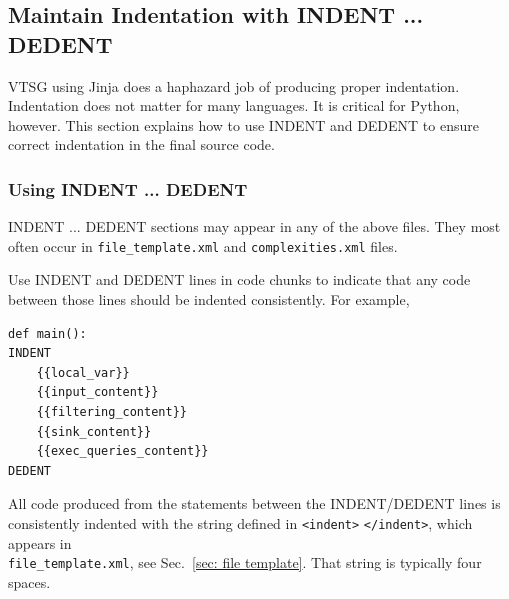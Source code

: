 \documentclass[12pt]{article}
\begin{document}
\subsection{Maintain Indentation with INDENT ... DEDENT}
\label{sec:indent}

VTSG using Jinja does a haphazard job of producing proper indentation.  Indentation
does not matter for many languages.  It is critical for Python, however.  This
section explains how to use INDENT and DEDENT to ensure correct indentation in the
final source code.

\subsubsection{Using INDENT ... DEDENT}
INDENT ... DEDENT sections may appear in any of the above files.  They
most often occur in \verb|file_template.xml| and \verb|complexities.xml| files.

Use INDENT and DEDENT lines in code chunks to indicate that
any code between those lines should be indented consistently.  For example,
\begin{verbatim}
def main():
INDENT
    {{local_var}}
    {{input_content}}
    {{filtering_content}}
    {{sink_content}}
    {{exec_queries_content}}
DEDENT
\end{verbatim}
All code produced from the statements between the INDENT/DEDENT lines is
consistently indented with the string defined in \verb|<indent>| \verb|</indent>|,
which appears in \\ \verb|file_template.xml|, see Sec.~\ref{sec: file template}.
That string is typically four spaces.
\end{document}
